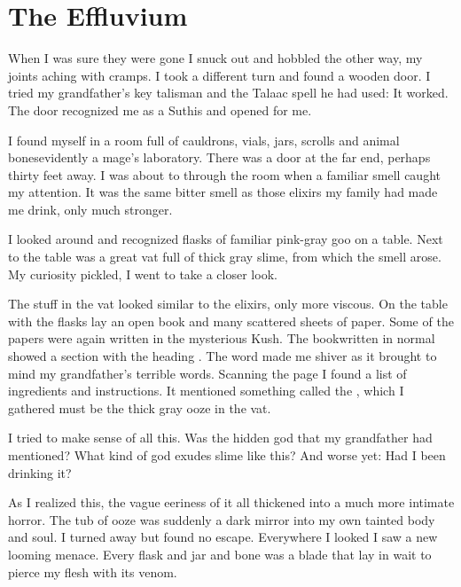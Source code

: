 \documentclass
  [a4paper,
   12pt,
   oneside
  ]%
  {article}
\begin{document}









\section{The Effluvium}
When I was sure they were gone I snuck out and hobbled the other way, my joints aching with cramps. 
I took a different turn and found a wooden door. 
I tried my grandfather's key talisman and the Talaac spell he had used: 
It worked. 
The door recognized me as a Suthis and opened for me. 

I found myself in a room full of cauldrons, vials, jars, scrolls and animal bones\dash evidently a mage's laboratory. 
There was a door at the far end, perhaps thirty feet away. 
I was about to through the room when a familiar smell caught my attention. 
It was the same bitter smell as those elixirs my family had made me drink, only much stronger.  

I looked around and recognized flasks of familiar pink-gray goo on a table.
Next to the table was a great vat full of thick gray slime, from which the smell arose. 
My curiosity pickled, I went to take a closer look.

The stuff in the vat looked similar to the elixirs, only more viscous.
On the table with the flasks lay an open book and many scattered sheets of paper. 
Some of the papers were again written in the mysterious Kush.%
The book\dash written in normal \Ortaican\dash showed a section with the heading .%
\index{\Ortaican}
The word  made me shiver as it brought to mind my grandfather's terrible words. 
Scanning the page I found a list of ingredients and instructions. 
It mentioned something called the , which I gathered must be the thick gray ooze in the vat. 

I tried to make sense of all this.
Was \Ubloth the hidden god that my grandfather had mentioned? 
What kind of god exudes slime like this? 
And worse yet: 
Had I been drinking it? 


As I realized this, the vague eeriness of it all thickened into a much more intimate horror. 
The tub of ooze was suddenly a dark mirror into my own tainted body and soul.
I turned away but found no escape. 
Everywhere I looked I saw a new looming menace. 
Every flask and jar and bone was a blade that lay in wait to pierce my flesh with its venom. 
\end{document}
